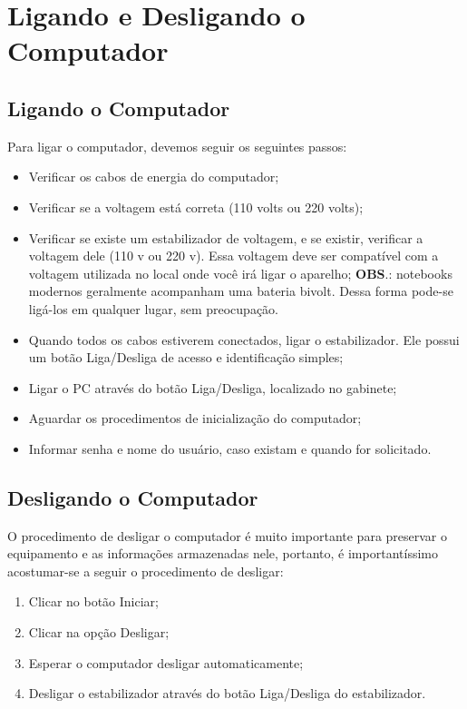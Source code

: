 \documentclass[hidelinks,12pt]{article}
\begin{document}
\section{Ligando e Desligando o Computador}
\subsection{Ligando o Computador}

	Para ligar o computador, devemos seguir os seguintes passos:
\begin{itemize}

	\item Verificar os cabos de energia do computador;

	\item Verificar se a voltagem está correta (110 volts ou 220 volts);

	\item Verificar se existe um estabilizador de voltagem, e se existir, verificar a voltagem dele (110 v ou 220 v). Essa voltagem deve ser compatível com a voltagem utilizada no local onde você irá ligar o aparelho;
	\textbf{OBS}.: notebooks modernos geralmente acompanham uma bateria bivolt. Dessa forma pode-se ligá-los em qualquer lugar, sem preocupação.

	\item Quando todos os cabos estiverem conectados, ligar o estabilizador. Ele possui um botão Liga/Desliga de acesso e identificação simples;

	\item Ligar o PC através do botão Liga/Desliga, localizado no gabinete;

	\item Aguardar os procedimentos de inicialização do computador;

	\item Informar senha e nome do usuário, caso existam e quando for solicitado.


\end{itemize}

\subsection{Desligando o Computador}
O procedimento de desligar o computador é muito importante para preservar o equipamento e as informações armazenadas nele, portanto, é importantíssimo acostumar-se a seguir o procedimento de desligar:

\begin{enumerate}
	\item Clicar no botão Iniciar;

	\item Clicar na opção Desligar;

	\item Esperar o computador desligar automaticamente;

	\item Desligar o estabilizador através do botão Liga/Desliga do estabilizador.
\end{enumerate}
\end{document}
